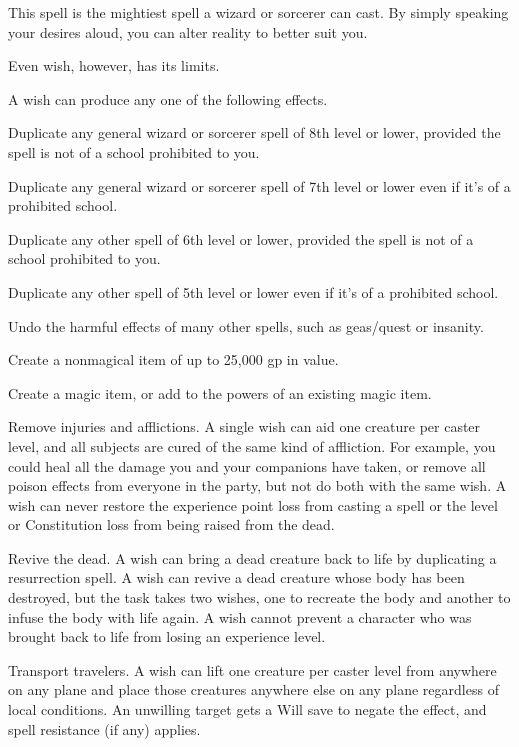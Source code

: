 \begin{spelleffect}
  This spell is the mightiest spell a wizard or sorcerer can cast. By simply speaking your desires aloud, you can alter reality to better suit you.
  \par Even wish, however, has its limits.
  \par A wish can produce any one of the following effects.
  \begin{itemize*}
    \item Duplicate any general wizard or sorcerer spell of 8th level or lower, provided the spell is not of a school prohibited to you.
    \item Duplicate any general wizard or sorcerer spell of 7th level or lower even if it's of a prohibited school.
    \item Duplicate any other spell of 6th level or lower, provided the spell is not of a school prohibited to you.
    \item Duplicate any other spell of 5th level or lower even if it's of a prohibited school. 
    \item Undo the harmful effects of many other spells, such as geas/quest or insanity.
    \item Create a nonmagical item of up to 25,000 gp in value.
    \item Create a magic item, or add to the powers of an existing magic item.
    \item Remove injuries and afflictions. A single wish can aid one creature per caster level, and all subjects are cured of the same kind of affliction. For example, you could heal all the damage you and your companions have taken, or remove all poison effects from everyone in the party, but not do both with the same wish. A wish can never restore the experience point loss from casting a spell or the level or Constitution loss from being raised from the dead.
    \item Revive the dead. A wish can bring a dead creature back to life by duplicating a resurrection spell. A wish can revive a dead creature whose body has been destroyed, but the task takes two wishes, one to recreate the body and another to infuse the body with life again. A wish cannot prevent a character who was brought back to life from losing an experience level.
    \item Transport travelers. A wish can lift one creature per caster level from anywhere on any plane and place those creatures anywhere else on any plane regardless of local conditions. An unwilling target gets a Will save to negate the effect, and spell resistance (if any) applies.

\end{itemize*}
\end{spelleffect}
